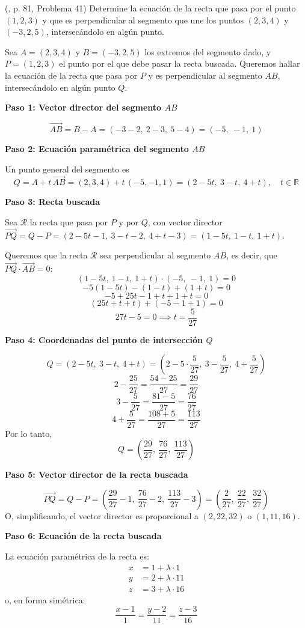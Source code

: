 \begin{prob} (\cite{espinoza2006Algebralineal}, p. 81, Problema 41) Determine la ecuación de la recta que pasa por el punto $(1,2,3)$ y que es perpendicular al segmento que une los puntos $(2,3,4)$ y $(-3,2,5)$, intersecándolo en algún punto.
\begin{myproof}
Sea $A = (2,3,4)$ y $B = (-3,2,5)$ los extremos del segmento dado, y $P = (1,2,3)$ el punto por el que debe pasar la recta buscada. Queremos hallar la ecuación de la recta que pasa por $P$ y es perpendicular al segmento $AB$, intersecándolo en algún punto $Q$.

\textbf{Paso 1: Vector director del segmento $AB$}

\[
\vec{AB} = B - A = (-3 - 2,\ 2 - 3,\ 5 - 4) = (-5,\ -1,\ 1)
\]

\textbf{Paso 2: Ecuación paramétrica del segmento $AB$}

Un punto general del segmento es
\[
Q = A + t\,\vec{AB} = (2,3,4) + t\,(-5,-1,1) = (2-5t,\ 3-t,\ 4+t), \quad t \in \mathbb{R}
\]

\textbf{Paso 3: Recta buscada}

Sea $\mathcal{R}$ la recta que pasa por $P$ y por $Q$, con vector director $\vec{PQ} = Q - P = (2-5t-1,\ 3-t-2,\ 4+t-3) = (1-5t,\ 1-t,\ 1+t)$.

Queremos que la recta $\mathcal{R}$ sea perpendicular al segmento $AB$, es decir, que $\vec{PQ} \cdot \vec{AB} = 0$:
\[
(1-5t,\ 1-t,\ 1+t) \cdot (-5,\ -1,\ 1) = 0
\]
\[
-5(1-5t) - (1-t) + (1+t) = 0
\]
\[
-5 + 25t - 1 + t + 1 + t = 0
\]
\[
(25t + t + t) + (-5 - 1 + 1) = 0
\]
\[
27t - 5 = 0 \implies t = \frac{5}{27}
\]

\textbf{Paso 4: Coordenadas del punto de intersección $Q$}

\[
Q = (2 - 5t,\ 3 - t,\ 4 + t) = \left(2 - 5 \cdot \frac{5}{27},\ 3 - \frac{5}{27},\ 4 + \frac{5}{27}\right)
\]
\[
2 - \frac{25}{27} = \frac{54 - 25}{27} = \frac{29}{27}
\]
\[
3 - \frac{5}{27} = \frac{81 - 5}{27} = \frac{76}{27}
\]
\[
4 + \frac{5}{27} = \frac{108 + 5}{27} = \frac{113}{27}
\]
Por lo tanto,
\[
Q = \left(\frac{29}{27},\ \frac{76}{27},\ \frac{113}{27}\right)
\]

\textbf{Paso 5: Vector director de la recta buscada}

\[
\vec{PQ} = Q - P = \left(\frac{29}{27} - 1,\ \frac{76}{27} - 2,\ \frac{113}{27} - 3\right) = \left(\frac{2}{27},\ \frac{22}{27},\ \frac{32}{27}\right)
\]
O, simplificando, el vector director es proporcional a $(2,22,32)$ o $(1,11,16)$.

\textbf{Paso 6: Ecuación de la recta buscada}

La ecuación paramétrica de la recta es:
\[
\boxed{
\begin{aligned}
x &= 1 + \lambda \cdot 1 \\
y &= 2 + \lambda \cdot 11 \\
z &= 3 + \lambda \cdot 16
\end{aligned}
}
\]
o, en forma simétrica:
\[
\boxed{
\frac{x - 1}{1} = \frac{y - 2}{11} = \frac{z - 3}{16}
}
\]
\end{myproof}

\end{prob}

